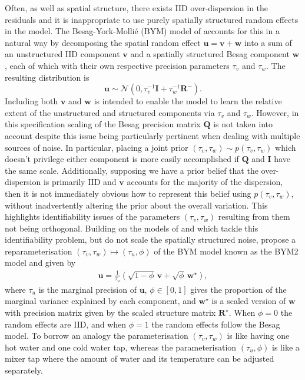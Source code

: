 \documentclass[a4paper, nobind]{templates/ociamthesis}
\newcommand{\N}{\mathcal{N}}
\newcommand{\bu}{\mathbf{u}}
\newcommand{\bv}{\mathbf{v}}
\newcommand{\w}{\mathbf{w}}
\begin{document}
Often, as well as spatial structure, there exists IID over-dispersion in the residuals and it is inappropriate to use purely spatially structured random effects in the model.
The Besag-York-Mollié (BYM) model of \textcite{besag1991bayesian} accounts for this in a natural way by decomposing the spatial random effect \(\bu = \bv + \w\) into a sum of an unstructured IID component \(\bv\) and a spatially structured Besag component \(\w\), each of which with their own respective precision parameters \(\tau_v\) and \(\tau_w\).
The resulting distribution is
\begin{equation}
    \bu \sim \N(0, \tau_v^{-1} \mathbf{I} + \tau_w^{-1} \mathbf{R}^{-}) \label{eq:bym}.
\end{equation}
Including both \(\bv\) and \(\w\) is intended to enable the model to learn the relative extent of the unstructured and structured components via \(\tau_v\) and \(\tau_w\).
However, in this specification scaling of the Besag precision matrix \(\mathbf{Q}\) is not taken into account despite this issue being particularly pertinent when dealing with multiple sources of noise.
In particular, placing a joint prior \((\tau_v, \tau_w) \sim p(\tau_v, \tau_w)\) which doesn't privilege either component is more easily accomplished if \(\mathbf{Q}\) and \(\mathbf{I}\) have the same scale.
Additionally, supposing we have a prior belief that the over-dispersion is primarily IID and \(\bv\) accounts for the majority of the dispersion, then it is not immediately obvious how to represent this belief using \(p(\tau_v, \tau_w)\), without inadvertently altering the prior about the overall variation.
This highlights identifiability issues of the parameters \((\tau_v, \tau_w)\) resulting from them not being orthogonal.
Building on the models of \textcite{leroux2000estimation} and \textcite{dean2001detecting} which tackle this identifiability problem, but do not scale the spatially structured noise, \textcite{simpson2017penalising} propose a reparameterisation \((\tau_v, \tau_w) \mapsto (\tau_u, \phi)\) of the BYM model known as the BYM2 model and given by
\begin{align}
\bu = \frac{1}{\tau_u} \left( \sqrt{1- \phi} \, \bv + \sqrt{\phi} \, \w^\star \right), \label{eq:bym2}
\end{align}
where \(\tau_u\) is the marginal precision of \(\bu\), \(\phi \in [0, 1]\) gives the proportion of the marginal variance explained by each component, and \(\w^\star\) is a scaled version of \(\w\) with precision matrix given by the scaled structure matrix \(\mathbf{R}^\star\).
When \(\phi = 0\) the random effects are IID, and when \(\phi = 1\) the random effects follow the Besag model.
To borrow an analogy \autocite{rue2020comment} the parameterisation \((\tau_v, \tau_w)\) is like having one hot water and one cold water tap, whereas the parameterisation \((\tau_u, \phi)\) is like a mixer tap where the amount of water and its temperature can be adjusted separately.
\end{document}
